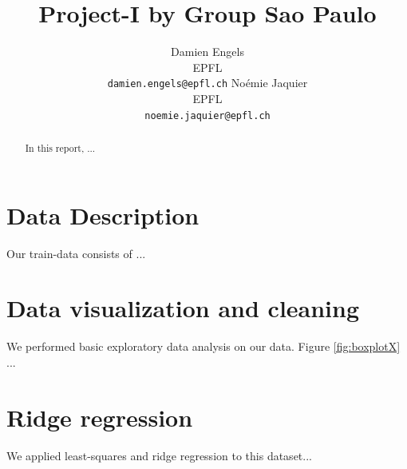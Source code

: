 \documentclass{article} %
\title{Project-I by Group Sao Paulo}
\author{
Damien Engels\\
EPFL \\
\texttt{damien.engels@epfl.ch} \And No\'emie Jaquier\\
EPFL \\
\texttt{noemie.jaquier@epfl.ch} \\
}
\begin{document}
\maketitle

\begin{abstract}
In this report, ...
\end{abstract}

\section{Data Description}
Our train-data consists of ...

\section{Data visualization and cleaning}
We performed basic exploratory data analysis on our data. Figure \ref{fig:boxplotX} ...

\begin{figure}[!h] %
\center
{}
\hfill
{}
\caption{}
\end{figure}

\section{Ridge regression}
We applied least-squares and ridge regression to this dataset...
\end{document}
